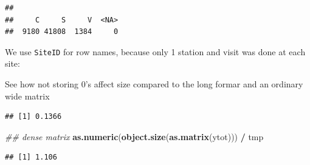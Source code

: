 \documentclass[12pt,]{book}
\newenvironment{Shaded}{\begin{snugshade}}{\end{snugshade}}
\newcommand{\CommentTok}[1]{\textcolor[rgb]{0.56,0.35,0.01}{\textit{#1}}}
\newcommand{\KeywordTok}[1]{\textcolor[rgb]{0.13,0.29,0.53}{\textbf{#1}}}
\newcommand{\NormalTok}[1]{#1}
\newcommand{\OperatorTok}[1]{\textcolor[rgb]{0.81,0.36,0.00}{\textbf{#1}}}
\newcommand{\StringTok}[1]{\textcolor[rgb]{0.31,0.60,0.02}{#1}}
\begin{document}
\begin{verbatim}
## 
##     C     S     V  <NA> 
##  9180 41808  1384     0
\end{verbatim}

We use \texttt{SiteID} for row names, because only 1 station and visit was done at each site:

\begin{Shaded}
\end{Shaded}

See how not storing 0's affect size compared to the long formar and an ordinary wide matrix

\begin{Shaded}
\end{Shaded}

\begin{verbatim}
## [1] 0.1366
\end{verbatim}

\begin{Shaded}
\begin{Highlighting}[]
\CommentTok{## dense matrix}
\KeywordTok{as.numeric}\NormalTok{(}\KeywordTok{object.size}\NormalTok{(}\KeywordTok{as.matrix}\NormalTok{(ytot))) }\OperatorTok{/}\StringTok{ }\NormalTok{tmp}
\end{Highlighting}
\end{Shaded}

\begin{verbatim}
## [1] 1.106
\end{verbatim}
\end{document}
